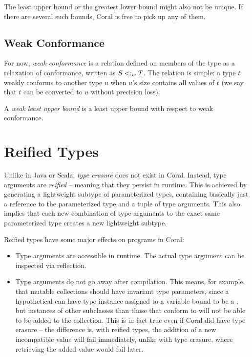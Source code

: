 The least upper bound or the greatest lower bound might also not be unique. If there are several such bounds, Coral is free to pick up any of them. 





\subsection{Weak Conformance}
\label{sec:weak-conformance}

For now, {\em weak conformance} is a relation defined on members of the  type as a relaxation of conformance, written as $S <: _w T$. The relation is simple: a type $t$ weakly conforms to another type $u$ when $u$'s size contains all values of $t$ (we say that $t$ can be converted to $u$ without precision loss). 

A {\em weak least upper bound} is a least upper bound with respect to weak conformance. 





\section{Reified Types}
\label{sec:reified-types}

Unlike in Java or Scala, {\em type erasure} does not exist in Coral. Instead, type arguments are {\em reified} -- meaning that they persist in runtime. This is achieved by generating a lightweight subtype of parameterized types, containing basically just a reference to the parameterized type and a tuple of type arguments. This also implies that each new combination of type arguments to the exact same parameterized type creates a new lightweight subtype.

Reified types have some major effects on programs in Coral:
\begin{itemize}

\item Type arguments are accessible in runtime. The actual type argument can be inspected via reflection. 

\item Type arguments do not go away after compilation. This means, for example, that mutable collections should have invariant type parameters, since a hypothetical  can have type instance  assigned to a variable bound to be a , but instances of other subclasses than those that conform to  will not be able to be added to the collection. This is in fact true even if Coral did have type erasure -- the difference is, with reified types, the addition of a new incompatible value will fail immediately, unlike with type erasure, where retrieving the added value would fail later. 
\end{itemize}





